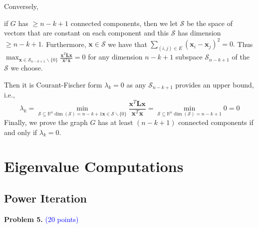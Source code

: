 \documentclass[english,onecolumn]{IEEEtran}
\begin{document}
\begin{enumerate}
Conversely, 

if $G$ has $\geq n-k+1$ connected components, then we let $\mathcal{S}$ be the space of vectors that are
constant on each component and this $\mathcal{S}$ has dimension $\geq n-k+1 .$ Furthermore, $\mathbf{x} \in \mathcal{S}$ we have that $\sum_{(i, j) \in E}\left(\mathbf{x}_{i}-\mathbf{x}_{j}\right)^{2}=0 .$ Thus $\max _{\mathbf{x} \in \mathcal{S}_{n-k+1} \backslash\{0\}} \frac{\mathbf{x}^{T} \mathbf{L} \mathbf{x}}{\mathbf{x}^{T} \mathbf{x}}=0$ for any dimension $n-k+1$ subspace $\mathcal{S}_{n-k+1}$
of the $\mathcal{S}$ we choose. 

Then it is Courant-Fischer form $\lambda_{k}=0$ as any $\mathcal{S}_{n-k+1}$ provides an upper bound, i.e.,
$$
\lambda_{k}=\min _{\mathcal{S} \subseteq \mathbb{R}^{n} \operatorname{dim}(\mathcal{S})=n-k+1 \mathbf{x} \in \mathcal{S} \backslash\{0\}} \frac{\mathbf{x}^{T} \mathbf{L} \mathbf{x}}{\mathbf{x}^{T} \mathbf{x}}=\min _{\mathcal{S} \subseteq \mathbb{R}^{n} \operatorname{dim}(\mathcal{S})=n-k+1} 0=0
$$
Finally, we prove the graph $G$ has at least $(n-k+1)$ connected components if and only if $\lambda_{k}=0$.
    
\end{enumerate}


\newpage

\section{Eigenvalue Computations}
\subsection{Power Iteration} 
\noindent
\textbf{Problem 5.}
\textcolor{blue}{(20 points)}
\end{document}
